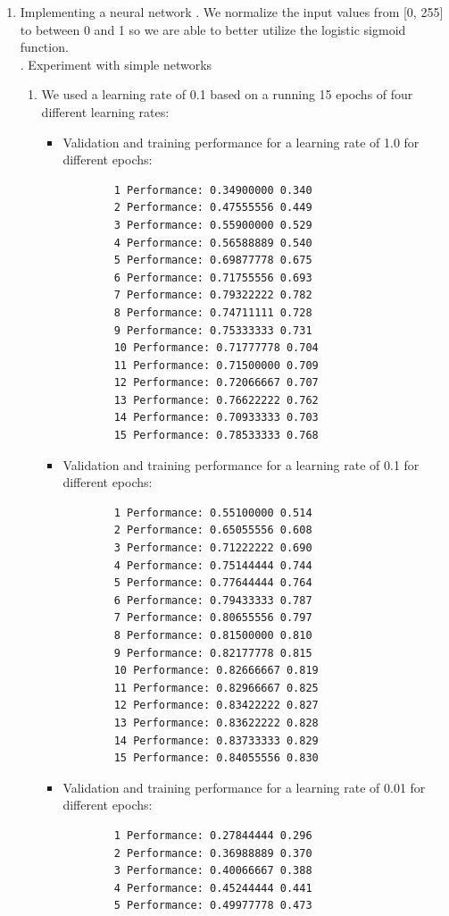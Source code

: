 \documentclass[11pt]{article}
\begin{document}
\begin{enumerate}
\begin{enumerate}
	\end{enumerate}
\item Implementing a neural network
\newline
{}. We normalize the input values from [0, 255] to between 0 and 1 so we are able to better utilize the logistic sigmoid function.\\ 
. Experiment with simple networks
\begin{enumerate}
\item We used a learning rate of 0.1 based on a running 15 epochs of four different learning rates:
	\begin{itemize}
	\item Validation and training performance for a learning rate of 1.0 for different epochs:
		\begin{verbatim}
		1 Performance: 0.34900000 0.340
		2 Performance: 0.47555556 0.449
		3 Performance: 0.55900000 0.529
		4 Performance: 0.56588889 0.540
		5 Performance: 0.69877778 0.675
		6 Performance: 0.71755556 0.693
		7 Performance: 0.79322222 0.782
		8 Performance: 0.74711111 0.728
		9 Performance: 0.75333333 0.731
		10 Performance: 0.71777778 0.704
		11 Performance: 0.71500000 0.709
		12 Performance: 0.72066667 0.707
		13 Performance: 0.76622222 0.762
		14 Performance: 0.70933333 0.703
		15 Performance: 0.78533333 0.768
		\end{verbatim}
	\item Validation and training performance for a learning rate of 0.1 for different epochs:
		\begin{verbatim}
		1 Performance: 0.55100000 0.514
		2 Performance: 0.65055556 0.608
		3 Performance: 0.71222222 0.690
		4 Performance: 0.75144444 0.744
		5 Performance: 0.77644444 0.764
		6 Performance: 0.79433333 0.787
		7 Performance: 0.80655556 0.797
		8 Performance: 0.81500000 0.810
		9 Performance: 0.82177778 0.815
		10 Performance: 0.82666667 0.819
		11 Performance: 0.82966667 0.825
		12 Performance: 0.83422222 0.827
		13 Performance: 0.83622222 0.828
		14 Performance: 0.83733333 0.829
		15 Performance: 0.84055556 0.830
		\end{verbatim}
	\item Validation and training performance for a learning rate of 0.01 for different epochs:
		\begin{verbatim}
		1 Performance: 0.27844444 0.296
		2 Performance: 0.36988889 0.370
		3 Performance: 0.40066667 0.388
		4 Performance: 0.45244444 0.441
		5 Performance: 0.49977778 0.473

\end{verbatim}
\end{itemize}
\end{enumerate}
\end{enumerate}
\end{document}
